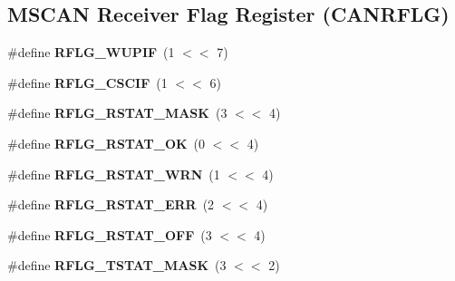\subsection*{M\+S\+C\+AN Receiver Flag Register (C\+A\+N\+R\+F\+LG)}
\begin{DoxyCompactItemize}
\item 
\mbox{\label{group__RTEMSBSPsPowerPCGen5200MSCAN_gaa442a3dfc93f7e9f55da99d08b4e7e6e}} 
\#define {\bfseries R\+F\+L\+G\+\_\+\+W\+U\+P\+IF}~(1 $<$$<$ 7)
\item 
\mbox{\label{group__RTEMSBSPsPowerPCGen5200MSCAN_ga02b490bc505e1d1e2c4fd698a0e79741}} 
\#define {\bfseries R\+F\+L\+G\+\_\+\+C\+S\+C\+IF}~(1 $<$$<$ 6)
\item 
\mbox{\label{group__RTEMSBSPsPowerPCGen5200MSCAN_ga1f286efa7f6bb59987382e8f128a1114}} 
\#define {\bfseries R\+F\+L\+G\+\_\+\+R\+S\+T\+A\+T\+\_\+\+M\+A\+SK}~(3 $<$$<$ 4)
\item 
\mbox{\label{group__RTEMSBSPsPowerPCGen5200MSCAN_gad412624d9da741ae7c044cce3e85c3d4}} 
\#define {\bfseries R\+F\+L\+G\+\_\+\+R\+S\+T\+A\+T\+\_\+\+OK}~(0 $<$$<$ 4)
\item 
\mbox{\label{group__RTEMSBSPsPowerPCGen5200MSCAN_gae2d17f9d9ded479587c1e4990640903b}} 
\#define {\bfseries R\+F\+L\+G\+\_\+\+R\+S\+T\+A\+T\+\_\+\+W\+RN}~(1 $<$$<$ 4)
\item 
\mbox{\label{group__RTEMSBSPsPowerPCGen5200MSCAN_gac45810601acba4897785ed6777b6773f}} 
\#define {\bfseries R\+F\+L\+G\+\_\+\+R\+S\+T\+A\+T\+\_\+\+E\+RR}~(2 $<$$<$ 4)
\item 
\mbox{\label{group__RTEMSBSPsPowerPCGen5200MSCAN_ga6d9e96b592b60c2f6718d1784b4efbed}} 
\#define {\bfseries R\+F\+L\+G\+\_\+\+R\+S\+T\+A\+T\+\_\+\+O\+FF}~(3 $<$$<$ 4)
\item 
\mbox{\label{group__RTEMSBSPsPowerPCGen5200MSCAN_gae4074815b478fcac8923af719a82b644}} 
\#define {\bfseries R\+F\+L\+G\+\_\+\+T\+S\+T\+A\+T\+\_\+\+M\+A\+SK}~(3 $<$$<$ 2)

\end{DoxyCompactItemize}
